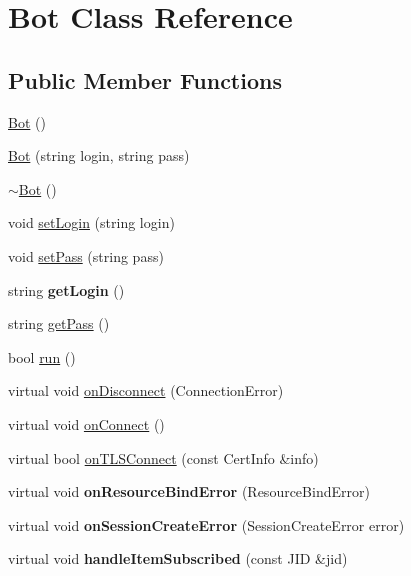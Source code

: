 \hypertarget{classBot}{
\section{Bot Class Reference}
\label{classBot}
}
\subsection*{Public Member Functions}
\begin{DoxyCompactItemize}
\item 
\hyperlink{classBot_ad3caff7fae06ebc75208758e11ee96ca}{Bot} ()
\item 
\hyperlink{classBot_a7e4d85945814c609d30130174bf57882}{Bot} (string login, string pass)
\item 
\hyperlink{classBot_a4163b0f6c91f94cbeb3145eeda8cd361}{$\sim$Bot} ()
\item 
void \hyperlink{classBot_acaf1de36b89e953cc6c9d8dd7f5a1350}{setLogin} (string login)
\item 
void \hyperlink{classBot_aa087635f92b0d5cdd63309217f426f0a}{setPass} (string pass)
\item 
\hypertarget{classBot_a668dad772f6d907459b94a79d4eda0f0}{
string {\bfseries getLogin} ()}
\label{classBot_a668dad772f6d907459b94a79d4eda0f0}

\item 
string \hyperlink{classBot_ae1fd92d41017a1ac754ca2ea5672e837}{getPass} ()
\item 
bool \hyperlink{classBot_acf50989223abde938fc015305a14a980}{run} ()
\item 
virtual void \hyperlink{classBot_aad1be105cd750c68b71972fab2dee745}{onDisconnect} (ConnectionError)
\item 
virtual void \hyperlink{classBot_ae00144b9d91d4b24ce206e88cada5de7}{onConnect} ()
\item 
virtual bool \hyperlink{classBot_ae58a92ec530bc62e3010308bd520a74f}{onTLSConnect} (const CertInfo \&info)
\item 
\hypertarget{classBot_a245cc6c9f9df8817e92c9a08fda1433e}{
virtual void {\bfseries onResourceBindError} (ResourceBindError)}
\label{classBot_a245cc6c9f9df8817e92c9a08fda1433e}

\item 
\hypertarget{classBot_a07c898997af1a63120d9f20f45c659d3}{
virtual void {\bfseries onSessionCreateError} (SessionCreateError error)}
\label{classBot_a07c898997af1a63120d9f20f45c659d3}

\item 
\hypertarget{classBot_a87373d105d7dc3c8c5cff2b2ed06383a}{
virtual void {\bfseries handleItemSubscribed} (const JID \&jid)}
\label{classBot_a87373d105d7dc3c8c5cff2b2ed06383a}


\end{DoxyCompactItemize}
